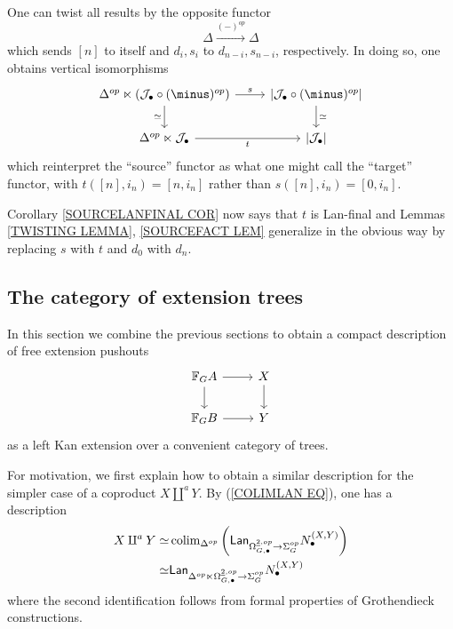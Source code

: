 \documentclass[a4paper,10pt]{article}%
\begin{document}
\begin{remark}\label{DUALRESULTS REM}
	One can twist all results by the opposite functor
	\[\Delta \xrightarrow{(\minus)^{op}} \Delta\]
	which sends $[n]$ to itself and $d_i,s_i$ to $d_{n-i},s_{n-i}$, respectively.
	In doing so, one obtains vertical isomorphisms	
\[
\begin{tikzcd}
	\Delta^{op} \ltimes \left(\mathcal{J}_{\bullet} \circ (\minus)^{op} \right) \ar{r}{s} \ar{d}[swap]{\simeq} &
	\left|\mathcal{J}_{\bullet} \circ (\minus)^{op}\right|
	\ar{d}{\simeq}
\\
	\Delta^{op} \ltimes \mathcal{J}_{\bullet} \ar{r}[swap]{t} &
	\left| \mathcal{J}_{\bullet} \right|
\end{tikzcd}
\]
which reinterpret the ``source'' functor as what one might call the ``target'' functor, with $t([n],i_n)= [n,i_n]$ rather than 
$s([n],i_n)= [0,i_n]$.

	Corollary \ref{SOURCELANFINAL COR} now says that $t$ is Lan-final
	and Lemmas \ref{TWISTING LEMMA}, \ref{SOURCEFACT LEM} generalize in the obvious way by replacing $s$ with $t$ and $d_0$ with $d_n$.
\end{remark}



\subsection{The category of extension trees}\label{EXTTREE SEC}

In this section we combine the previous sections to obtain a compact description of free extension pushouts
\begin{equation}\label{FREEEXT EQ}
\begin{tikzcd}
	\mathbb{F}_G A \ar{r} \ar{d} & X \ar{d}
\\
	\mathbb{F}_G B \ar{r} & Y
\end{tikzcd}
\end{equation}
as a left Kan extension over a convenient category of trees.

For motivation, we first explain how to obtain a similar description for the simpler case of a coproduct $X \amalg^a Y$.
By (\ref{COLIMLAN EQ}), one has a description 
\begin{align*}
	X \amalg^a Y \simeq  &
	\operatorname{colim}_{\Delta^{op}}
	\left(
	\mathsf{Lan}_{\Omega_{G,\bullet}^{\underline{2},op} \to \Sigma_G^{op}}
	N_{\bullet}^{(X,Y)}
	\right)
\\
	\simeq &
	\mathsf{Lan}_{\Delta^{op} \ltimes \Omega_{G,\bullet}^{\underline{2},op} \to \Sigma_G^{op}}
	N_{\bullet}^{(X,Y)}
\end{align*}
where the second identification follows from formal properties of Grothendieck constructions.
\end{document}
